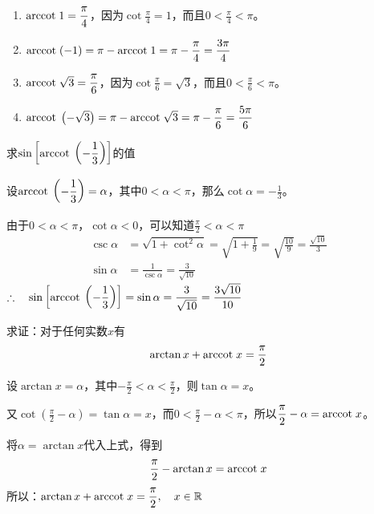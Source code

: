 \begin{solution}
\begin{enumerate}
    \item ${\rm arccot\; } 1=\dfrac{\pi}{4}$，因为$\cot\frac{\pi}{4}=1$，而且$0<\frac{\pi}{4}<\pi$。
    \item ${\rm arccot\; } (- 1)=\pi-{\rm arccot\; } 1=\pi-\dfrac{\pi}{4}=\dfrac{3\pi}{4}$
    \item ${\rm arccot\; } \sqrt{3}=\dfrac{\pi}{6}$，因为$\cot\frac{\pi}{6}=\sqrt{3}$，而且$0<\frac{\pi}{6}<\pi$。
    \item ${\rm arccot\; } \left(-\sqrt{3}\right)=\pi-{\rm arccot\; }\sqrt{3}=\pi-\dfrac{\pi}{6}=\dfrac{5\pi}{6}$
\end{enumerate}
\end{solution}


\begin{example}
    求$\sin\left[{\rm arccot\; }\left(-\dfrac{1}{3}\right)\right]$的值
\end{example}

\begin{solution}
    设${\rm arccot\; }\left(-\dfrac{1}{3}\right)=\alpha$，其中$0<\alpha<\pi$，那么$\cot\alpha=-\frac{1}{3}$。

    由于$0<\alpha<\pi$，$\cot\alpha<0$，可以知道$\frac{\pi}{2}<\alpha<\pi$
\[\begin{split}
    \csc\alpha&=\sqrt{1+\cot^2\alpha}=\sqrt{1+\frac{1}{9}}=\sqrt{\frac{10}{9}}=\frac{\sqrt{10}}{3}\\
    \sin\alpha&=\frac{1}{\csc\alpha}=\frac{3}{\sqrt{10}}
\end{split}\]
$\therefore\quad \sin\left[{\rm arccot\; }\left(-\dfrac{1}{3}\right)\right]=\sin\alpha=\dfrac{3}{\sqrt{10}}=\dfrac{3\sqrt{10}}{10}$
\end{solution}


\begin{example}
    求证：对于任何实数$x$有
\[\arctan x+{\rm arccot\; } x=\dfrac{\pi}{2}\]
\end{example}

\begin{solution}
    设$\arctan x=\alpha$，其中$-\frac{\pi}{2}<\alpha<\frac{\pi}{2}$，则$\tan\alpha=x$。

    又$\cot\left(\frac{\pi}{2}-\alpha\right)=\tan\alpha=x$，而$0<\frac{\pi}{2}-\alpha<\pi$，所以$\dfrac{\pi}{2}-\alpha={\rm arccot\; } x$。

    将$\alpha=\arctan x$代入上式，得到
    \[\dfrac{\pi}{2}-\arctan x={\rm arccot\; } x\]
    所以：$\arctan x+{\rm arccot\; } x=\dfrac{\pi}{2},\quad x\in\mathbb{R}$
\end{solution}


